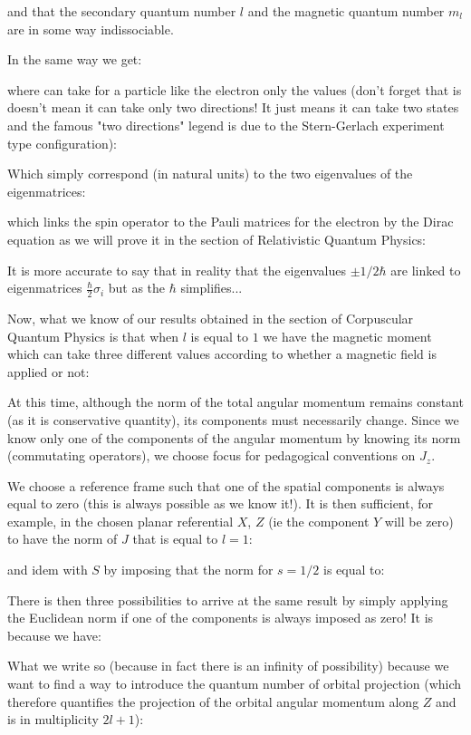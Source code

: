 	and that the secondary quantum number $l$ and the magnetic quantum number $m_l$ are in some way indissociable.

	In the same way we get:
	
	where can take for a particle like the electron only the values (don't forget that is doesn't mean it can take only two directions! It just means it can take two states and the famous "two directions" legend is due to the Stern-Gerlach experiment type configuration):
	
	Which simply correspond (in natural units) to the two eigenvalues of the eigenmatrices:
	
	which links the spin operator to the Pauli matrices for the electron  by the Dirac equation as we will prove it in the section of Relativistic Quantum Physics:
	
	\begin{tcolorbox}[title=Remark,colframe=black,arc=10pt]
	It is more accurate to say that in reality that the eigenvalues $\pm 1/2\hbar$ are linked to eigenmatrices $\frac{\hbar}{2}\sigma_i$ but as the $\hbar$ simplifies...
	\end{tcolorbox}
	Now, what we know of our results obtained in the section of Corpuscular Quantum Physics is that when $l$ is equal to $1$ we have the magnetic moment which can take three different values according to whether a magnetic field is applied or not:
	
	At this time, although the norm of the total angular momentum remains constant (as it is conservative quantity), its components must necessarily change. Since we know only one of the components of the angular momentum by knowing its norm (commutating operators), we choose focus for pedagogical conventions on $J_z$.
	
	We choose a reference frame such that one of the spatial components is always equal to zero (this is always possible as we know it!). It is then sufficient, for example, in the chosen planar referential $X$, $Z$ (ie the component $Y$ will be zero) to have the norm of $J$ that is equal to $l=1$:
	
	and idem with $S$ by imposing that the norm for $s = 1/2$ is equal to:
	
	There is then three possibilities to arrive at the same result by simply applying the Euclidean norm if one of the components is always imposed as zero! It is because we have:
	
	What we write so (because in fact there is an infinity of possibility) because we want to find a way to introduce the quantum number of orbital projection (which therefore quantifies the projection of the orbital angular momentum along $Z$ and is in multiplicity $2l + 1$):
	
